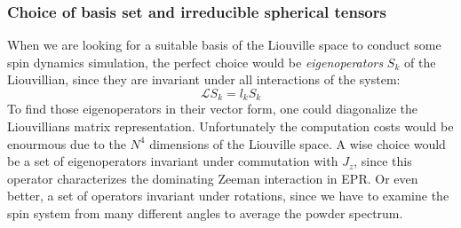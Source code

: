 \documentclass[11.5pt,a4paper]{article}
\begin{document}
\subsubsection{Choice of basis set and irreducible spherical tensors}
When we are looking for a suitable basis of the Liouville space to conduct some spin dynamics simulation, the perfect choice would be \emph{eigenoperators} $S_k$ of the Liouvillian, since they are invariant under all interactions of the system:
\begin{equation}
  \mathcal{L} S_k = l_k S_k
\end{equation}
To find those eigenoperators in their vector form, one could diagonalize the Liouvillians matrix representation. Unfortunately the computation costs would be enourmous due to the $N^4$ dimensions of the Liouville space. A wise choice would be a set of eigenoperators invariant under commutation with $J_z$, since this operator characterizes the dominating Zeeman interaction in EPR. Or even better, a set of operators invariant under rotations, since we have to examine the spin system from many different angles to average the powder spectrum.
\end{document}
